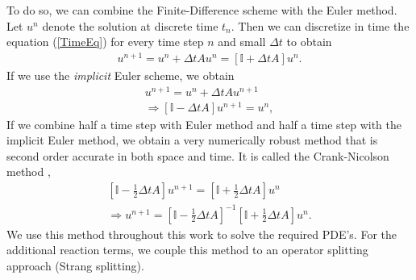 \documentclass[10pt,twocolumn]{revtex4-1}
\begin{document}
	\noindent To do so, we can combine the Finite-Difference scheme with the Euler method. Let $u^{n}$ denote the solution at discrete time $t_{n}$. Then we can discretize in time the equation (\ref{TimeEq}) for every time step $n$ and small $\Delta t$  to obtain
	\begin{align}
	\label{Euler}
	u^{n+1}=u^{n}+\Delta t A u^{n} = [\mathbb{I} + \Delta t A]u^{n}.
	\end{align}
	If we use the \textit{implicit} Euler scheme, we obtain
	\begin{align*}
	u^{n+1}=u^{n}+\Delta t Au^{n+1} \\
	\Rightarrow [\mathbb{I}-\Delta t A]u^{n+1} = u^n,
	\end{align*}
	If we combine half a time step with Euler method and half a time step with the implicit Euler method, we obtain a very numerically robust method that is second order accurate in both space and time. It is called the Crank-Nicolson method \cite{jovanovic2013analysis, leveque2007finite},
	\begin{align*}
	\left[\mathbb{I}-\frac{1}{2}\Delta t A\right]u^{n+1} =
	\left[\mathbb{I}+\frac{1}{2}\Delta t A\right]u^{n} \\
	\Rightarrow         
	u^{n+1} =\left[\mathbb{I}-\frac{1}{2}\Delta t A\right]^{-1}
	\left[\mathbb{I}+\frac{1}{2}\Delta t A\right]u^{n}.
	\end{align*}
	We use this method throughout this work to solve the required PDE's. For the additional reaction terms, we couple this method to an operator splitting approach (Strang splitting). 
	
\end{document}
